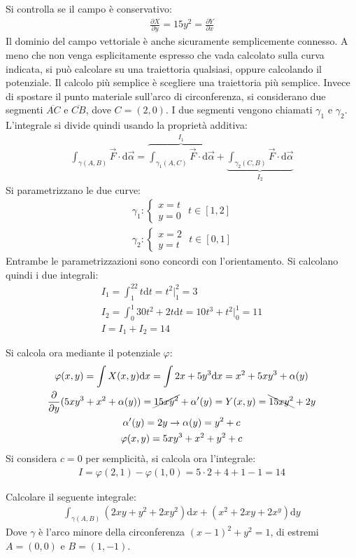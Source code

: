 \documentclass{article}
\newcommand{\df}{\mathrm{d}}
\numberwithin{equation}{subsection}
\begin{document}
Si controlla se il campo è conservativo:
\begin{gather*}
    \frac{\partial X}{\partial y}=15y^2=\frac{\partial Y}{\partial x}
\end{gather*}
Il dominio del campo vettoriale è anche sicuramente semplicemente connesso. A meno che non venga esplicitamente espresso che vada calcolato sulla curva indicata, si può calcolare su una traiettoria qualsiasi, oppure calcolando il potenziale. 
Il calcolo più semplice è scegliere una traiettoria più semplice. Invece di spostare il punto materiale sull'arco di circonferenza, si considerano due segmenti $\overline{AC}$ e $\overline{CB}$, dove $C=(2,0)$. I due segmenti vengono chiamati $\gamma_1$ e $\gamma_2$. L'integrale si divide quindi usando la proprietà additiva:
\begin{gather*}
    \int_{\gamma(A,B)}\vec{F}\cdot\df\vec{\alpha}=
    \overbrace{\int_{\gamma_1(A,C)}\vec{F}\cdot\df\vec{\alpha}}^{I_1}+
    \underbrace{\int_{\gamma_2(C,B)}\vec{F}\cdot\df\vec{\alpha}}_{I_2}
\end{gather*}
Si parametrizzano le due curve:
\begin{gather*}
    \gamma_1:\begin{cases}
        x=t\\y=0
    \end{cases}\,\, t\in[1,2]\\
    \gamma_2:\begin{cases}
        x=2\\y=t
    \end{cases}\,\, t\in[0,1]
\end{gather*}
Entrambe le parametrizzazioni sono concordi con l'orientamento. Si calcolano quindi i due integrali:
\begin{gather*}
    I_1=\int_1^22t\df t=t^2\bigg|_1^2=3\\
    I_2=\int_0^1 30t^2+2t\df t=10t^3+t^2\bigg|_0^1=11\\
    I=I_1+I_2=14
\end{gather*}


Si calcola ora mediante il potenziale $\varphi$:
\begin{gather*}
    \varphi(x,y)=\int X(x,y)\df x=\int2x+5y^3\df x=x^2+5xy^3+\alpha(y)\\
    \frac{\partial}{\partial y}(5xy^3+x^2+\alpha(y))=\cancel{15xy^2}+\alpha'(y)=Y(x,y)=\bcancel{15xy^2}+2y\\
    \alpha'(y)=2y\to\alpha(y)=y^2+c\\
    \varphi(x,y)=5xy^3+x^2+y^2+c
\end{gather*}
Si considera $c=0$ per semplicità, si calcola ora l'integrale:
\begin{gather*}
    I=\varphi(2,1)-\varphi(1,0)=5\cdot2+4+1-1=14
\end{gather*}


Calcolare il seguente integrale:
\begin{gather*}
    \int_{\gamma(A,B)}(2xy+y^2+2xy^2)\df x+(x^2+2xy+2x^y)\df y
\end{gather*}
Dove $\gamma$ è l'arco minore della circonferenza $(x-1)^2+y^2=1$, di estremi $A=(0,0)$ e $B=(1,-1)$. 


\clearpage
\end{document}

